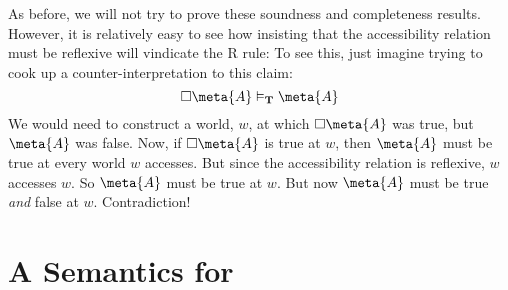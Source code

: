 As before, we will not try to prove these soundness and completeness results. However, it is relatively easy to see how insisting that the accessibility relation must be reflexive will vindicate the R\mlT{} rule:
To see this, just imagine trying to cook up a counter-interpretation to this claim:
\[
	\ebox \meta{A}\entails_\mlT \meta{A}
\]
We would need to construct a world, $w$, at which $\ebox \meta{A}$ was true, but $\meta{A}$ was false. Now, if $\ebox \meta{A}$ is true at $w$, then $\meta{A}$ must be true at every world $w$ accesses. But since the accessibility relation is reflexive, $w$ accesses $w$. So $\meta{A}$ must be true at $w$. But now $\meta{A}$ must be true \emph{and} false at $w$. Contradiction!

\section{A Semantics for \mlSfour}
\label{SemanticsS4}

